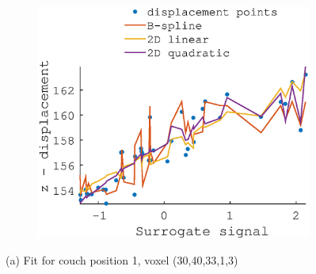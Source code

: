 \documentclass[11pt,a4paper,oneside]{report}
\begin{document}
\begin{figure}[H]
\begin{subfigure}[b]{0.33\textwidth}
  \end{subfigure}
    ~ %
  \begin{subfigure}[b]{0.33\textwidth}
    \includegraphics[width=\textwidth]{figures/task2/fit_round3_couch1.eps}
  \end{subfigure}
  (a) Fit for couch position 1, voxel (30,40,33,1,3)
  \vspace*{1em}
  

\end{figure}
\end{document}
